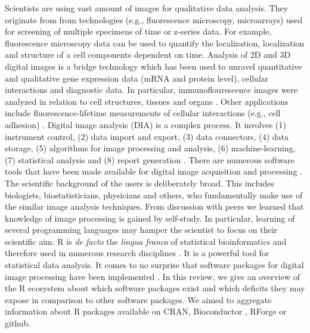 Scientists are using vast amount of images for qualitative data analysis. They 
originate from from technologies (e.g., fluorescence microscopy, microarrays) 
used for screening of multiple specimens of time or z-series data. For example, 
fluorescence microscopy data can be used to quantify the localization, 
localization and structure of a cell components dependent on time. Analysis of 
2D and 3D digital images is a bridge technology which has been used to unravel 
quantitative and qualitative gene expression data (mRNA and protein level), 
cellular interactions and diagnostic data. In particular, immunoflourescence 
images were analyzed in relation to cell structures, tissues and organs 
\citep{chieco_image_2013, rodiger_highly_2013, schierack_species-specific_2014, 
willitzki_new_2012}. Other applications include fluorescence-lifetime 
measurements of cellular interactions (e.g., cell adhesion) 
\citep{eliceiri_biological_2012, schierack_species-specific_2014}. Digital image 
analysis (DIA) is a complex process. It involves (1) instrument control, (2) 
data import and export, (3) data connectors, (4) data storage, (5) algorithms 
for image processing and analysis, (6) machine-learning, (7) statistical 
analysis and (8) report generation \citep{eliceiri_biological_2012}. There are 
numerous software tools that have been made available for digital image 
acquisition and processing \citep{wiesmann_review_2015, chieco_image_2013, 
eliceiri_biological_2012}. The scientific background of the users is 
deliberately broad. This includes biologists, biostatisticians, physicians and 
others, who fundamentally make use of the similar image analysis techniques. 
From discussion with peers we learned that knowledge of image processing is 
gained by self-study. In particular, learning of several programming languages 
may hamper the scientist to focus on their scientific aim. R \citep{R} is 
\textit{de facto} the \textit{lingua franca} of statistical bioinformatics and 
therefore used in numerous research disciplines \citep{rodiger_r_2015}. It is a 
powerful tool for statistical data analysis. It comes to no surprise that 
software packages for digital image processing have been implemented 
\citep{frery_introduction_2013}. In this review, we give an overview of the R 
ecosystem about which software packages exist and which deficits they may expose 
in comparison to other software packages. We aimed to aggregate information 
about R packages available on CRAN, Bioconductor 
\citep{gentleman_bioconductor:_2004}, RForge or github.


